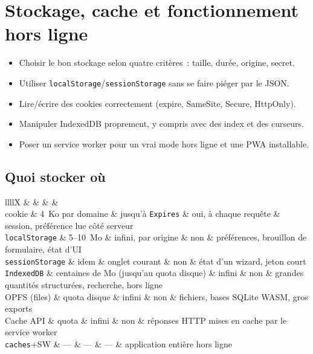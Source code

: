 \chapter{Stockage, cache et fonctionnement hors ligne}
\label{ch-js-storage}

\begin{objectif}
\begin{itemize}
  \item Choisir le bon stockage selon quatre crit\`eres~: taille, dur\'ee, origine, secret.
  \item Utiliser \texttt{localStorage}/\texttt{sessionStorage} sans se faire pi\'eger par le JSON.
  \item Lire/\'ecrire des cookies correctement (expire, SameSite, Secure, HttpOnly).
  \item Manipuler IndexedDB proprement, y compris avec des index et des curseurs.
  \item Poser un service worker pour un vrai mode hors ligne et une PWA installable.
\end{itemize}
\end{objectif}

\section{Quoi stocker o\`u}

\begin{tabz}{llllX}
  \headrow {} \&  \&  \&  \&  \\
  \midrule
  cookie \& 4~Ko par domaine \& jusqu'\`a \verb|Expires| \& oui, \`a chaque requ\^ete \& session, pr\'ef\'erence lue c\^ot\'e serveur \\
  \verb|localStorage| \& 5--10~Mo \& infini, par origine \& non \& pr\'ef\'erences, brouillon de formulaire, \'etat d'UI \\
  \verb|sessionStorage| \& idem \& onglet courant \& non \& \'etat d'un wizard, jeton court \\
  \verb|IndexedDB| \& centaines de Mo (jusqu'au quota disque) \& infini \& non \& grandes quantit\'es structur\'ees, recherche, hors ligne \\
  OPFS (files) \& quota disque \& infini \& non \& fichiers, bases SQLite WASM, gros exports \\
  Cache API \& quota \& infini \& non \& r\'eponses HTTP mises en cache par le service worker \\
  \verb|caches|+SW \& --- \& --- \& --- \& application enti\`ere hors ligne \\
\end{tabz}

